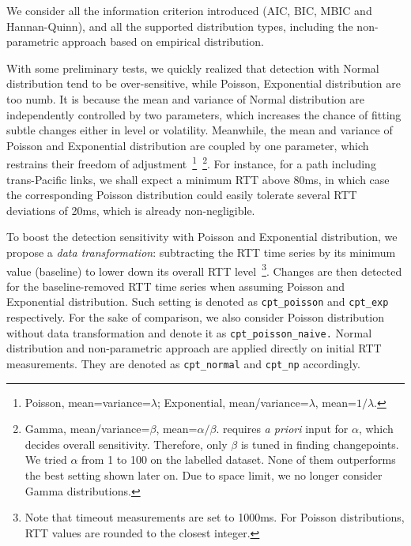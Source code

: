 We consider all the information criterion introduced (AIC, BIC, MBIC and Hannan-Quinn), and all the supported distribution types, including the non-parametric approach based on empirical distribution.

With some preliminary tests, we quickly realized that detection with Normal distribution tend to be over-sensitive, while Poisson, Exponential distribution are too numb.
It is because the mean and variance of Normal distribution are independently controlled by two parameters, which increases the chance of fitting subtle changes either in level or volatility.
Meanwhile, the mean and variance of Poisson and Exponential distribution are coupled by one parameter,
which restrains their freedom of adjustment~\footnote{Poisson, mean=variance=$\lambda$; Exponential, mean/variance=$\lambda$, mean=$1/\lambda$.}~\footnote{Gamma, mean/variance=$\beta$, mean=$\alpha/\beta$. \cite{Killick2013a} requires \textit{a priori} input for $\alpha$, which decides overall sensitivity. Therefore, only $\beta$ is tuned in finding changepoints.
We tried $\alpha$ from 1 to 100 on the labelled dataset. None of them outperforms the best setting shown later on. Due to space limit, we no longer consider Gamma distributions.}.
For instance, for a path including trans-Pacific links, we shall expect a minimum RTT above 80ms, in which case the corresponding Poisson distribution could easily tolerate several RTT deviations of 20ms, which is already non-negligible.


To boost the detection sensitivity with Poisson and Exponential distribution, we propose a \textit{data transformation}: subtracting the RTT time series by its minimum value (baseline) to lower down its overall RTT level~\footnote{Note that timeout measurements are set to 1000ms. For Poisson distributions, RTT values are rounded to the closest integer.}. 
Changes are then detected for the baseline-removed RTT time series when assuming Poisson and Exponential distribution.
Such setting is denoted as \texttt{cpt\_poisson} and \texttt{cpt\_exp} respectively.
For the sake of comparison, we also consider Poisson distribution without data transformation and denote it as \texttt{cpt\_poisson\_naive.}
Normal distribution and non-parametric approach are applied directly on initial RTT measurements.
They are denoted as \texttt{cpt\_normal} and \texttt{cpt\_np} accordingly.


